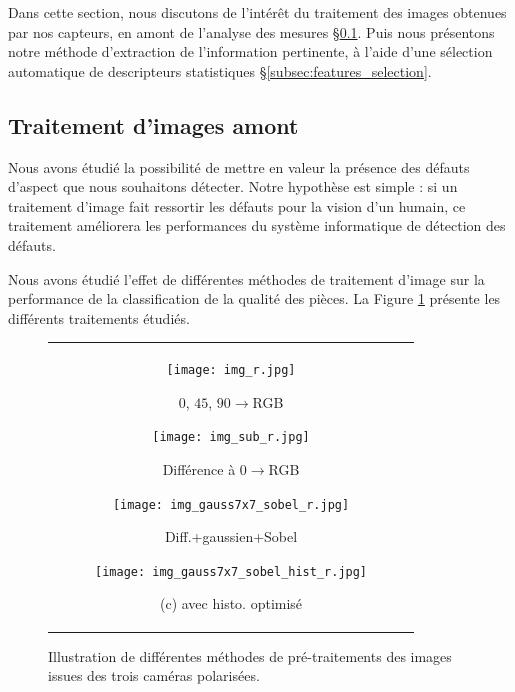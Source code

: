 Dans cette section, nous discutons de l'intérêt du traitement des images obtenues par nos capteurs, en amont de l'analyse des mesures §\ref{subsec:image_preprocessing}.
Puis nous présentons notre méthode d'extraction de l'information pertinente, à l'aide d'une sélection automatique de descripteurs statistiques §\ref{subsec:features_selection}.

\subsection{Traitement d'images amont} \label{subsec:image_preprocessing}
Nous avons étudié la possibilité de mettre en valeur la présence des défauts d'aspect que nous souhaitons détecter.
Notre hypothèse est simple : si un traitement d'image fait ressortir les défauts pour la vision d'un humain, ce traitement améliorera les performances du système informatique de détection des défauts.

Nous avons étudié l'effet de différentes méthodes de traitement d'image sur la performance de la classification de la qualité des pièces.
La Figure \ref{fig:preprocessing} présente les différents traitements étudiés.

\begin{figure}[bthp]
	\begin{center}
		\begin{tabular}{c}
			\begin{subfigure}[b]{0.245\linewidth}
				\texttt{[image: img\_r.jpg]}
				\caption{$0$\degree, $45$\degree, $90$\degree$\rightarrow$RGB}
			\end{subfigure}
			\begin{subfigure}[b]{0.245\linewidth}
				\texttt{[image: img\_sub\_r.jpg]}
				\caption{Différence à $0$\degree$\rightarrow$RGB}
			\end{subfigure}
			\begin{subfigure}[b]{0.245\linewidth}
				\texttt{[image: img\_gauss7x7\_sobel\_r.jpg]}
				\caption{Diff.+gaussien+Sobel}
			\end{subfigure}
			\begin{subfigure}[b]{0.245\linewidth}
				\texttt{[image: img\_gauss7x7\_sobel\_hist\_r.jpg]}
				\caption{(c) avec histo. optimisé}
			\end{subfigure}
		\end{tabular}
	\end{center}
	\caption{Illustration de différentes méthodes de pré-traitements des images issues des trois caméras polarisées.}
	\label{fig:preprocessing}
\end{figure}

